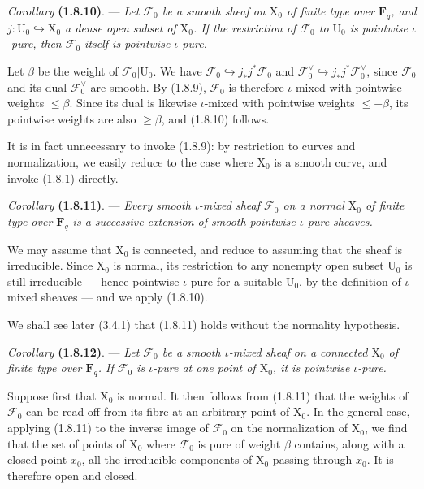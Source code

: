\documentclass[11pt,leqno]{article}
\begin{document}
\textit{Corollary} \textbf{(1.8.10)}. — \textit{Let \(\mathscr{F}_0\) be a smooth sheaf on \(\mathrm{X}_0\) of finite type over \(\mathbf{F}_q\), and \(j:\mathrm{U}_0\hookrightarrow\mathrm{X}_0\) a dense open subset of \(\mathrm{X}_0\). If the restriction of \(\mathscr{F}_0\) to \(\mathrm{U}_0\) is pointwise \(\iota\)-pure, then \(\mathscr{F}_0\) itself is pointwise \(\iota\)-pure.}

Let \(\beta\) be the weight of \(\mathscr{F}_0\vert\mathrm{U}_0\). We have \(\mathscr{F}_0\hookrightarrow j_*j^*\mathscr{F}_0\) and \(\mathscr{F}_0^\vee\hookrightarrow j_*j^*\mathscr{F}_0^\vee\), since \(\mathscr{F}_0\) and its dual \(\mathscr{F}_0^\vee\) are smooth. By (1.8.9), \(\mathscr{F}_0\) is therefore \(\iota\)-mixed with pointwise weights \(\leq\beta\). Since its dual is likewise \(\iota\)-mixed with pointwise weights \(\leq-\beta\), its pointwise weights are also \(\geq\beta\), and (1.8.10) follows.

It is in fact unnecessary to invoke (1.8.9): by restriction to curves and normalization, we easily reduce to the case where \(\mathrm{X}_0\) is a smooth curve, and invoke (1.8.1) directly.

\textit{Corollary} \textbf{(1.8.11)}. — \textit{Every smooth \(\iota\)-mixed sheaf \(\mathscr{F}_0\) on a normal \(\mathrm{X}_0\) of finite type over \(\mathbf{F}_q\) is a successive extension of smooth pointwise \(\iota\)-pure sheaves.}

We may assume that \(\mathrm{X}_0\) is connected, and reduce to assuming that the sheaf is irreducible. Since \(\mathrm{X}_0\) is normal, its restriction to any nonempty open subset \(\mathrm{U}_0\) is still irreducible — hence pointwise \(\iota\)-pure for a suitable \(\mathrm{U}_0\), by the definition of \(\iota\)-mixed sheaves — and we apply (1.8.10).

We shall see later (3.4.1) that (1.8.11) holds without the normality hypothesis.

\textit{Corollary} \textbf{(1.8.12)}. — \textit{Let \(\mathscr{F}_0\) be a smooth \(\iota\)-mixed sheaf on a connected \(\mathrm{X}_0\) of finite type over \(\mathbf{F}_q\). If \(\mathscr{F}_0\) is \(\iota\)-pure at one point of \(\mathrm{X}_0\), it is pointwise \(\iota\)-pure.}

Suppose first that \(\mathrm{X}_0\) is normal. It then follows from (1.8.11) that the weights of \(\mathscr{F}_0\) can be read off from its fibre at an arbitrary point of \(\mathrm{X}_0\). In the general case, applying (1.8.11) to the inverse image of \(\mathscr{F}_0\) on the normalization of \(\mathrm{X}_0\), we find that the set of points of \(\mathrm{X}_0\) where \(\mathscr{F}_0\) is pure of weight \(\beta\) contains, along with a closed point \(x_0\), all the irreducible components of \(\mathrm{X}_0\) passing through \(x_0\). It is therefore open and closed.
\end{document}
